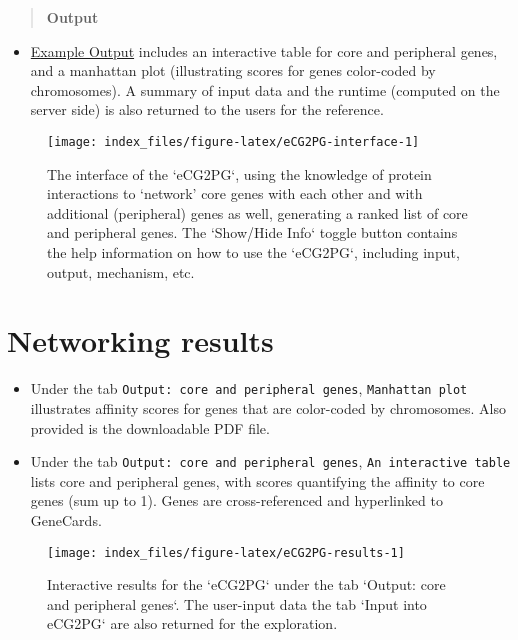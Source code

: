 \documentclass[
  oneside]{book}
\providecommand{\tightlist}{%
  \setlength{\itemsep}{0pt}\setlength{\parskip}{0pt}}
\begin{document}
\begin{quote}
\textbf{Output}
\end{quote}

\begin{itemize}
\tightlist
\item
  \href{/app/examples/_tmp_RMD_eCG2PG.html}{Example Output} includes an interactive table for core and peripheral genes, and a manhattan plot (illustrating scores for genes color-coded by chromosomes). A summary of input data and the runtime (computed on the server side) is also returned to the users for the reference.
\end{itemize}

\begin{figure}

{\centering \texttt{[image: index\_files/figure-latex/eCG2PG-interface-1]} 

}

\caption{The interface of the `eCG2PG`, using the knowledge of protein interactions to ‘network’ core genes with each other and with additional (peripheral) genes as well, generating a ranked list of core and peripheral genes. The `Show/Hide Info` toggle button contains the help information on how to use the `eCG2PG`, including input, output, mechanism, etc.}\label{fig:eCG2PG-interface}
\end{figure}

\hypertarget{networking-results}{%
\section{Networking results}\label{networking-results}}

\begin{itemize}
\item
  Under the tab \texttt{Output:\ core\ and\ peripheral\ genes}, \texttt{Manhattan\ plot} illustrates affinity scores for genes that are color-coded by chromosomes. Also provided is the downloadable PDF file.
\item
  Under the tab \texttt{Output:\ core\ and\ peripheral\ genes}, \texttt{An\ interactive\ table} lists core and peripheral genes, with scores quantifying the affinity to core genes (sum up to 1). Genes are cross-referenced and hyperlinked to GeneCards.
\end{itemize}

\begin{figure}

{\centering \texttt{[image: index\_files/figure-latex/eCG2PG-results-1]} 

}

\caption{Interactive results for the `eCG2PG` under the tab `Output: core and peripheral genes`. The user-input data the tab `Input into eCG2PG` are also returned for the exploration.}\label{fig:eCG2PG-results}
\end{figure}
\end{document}
